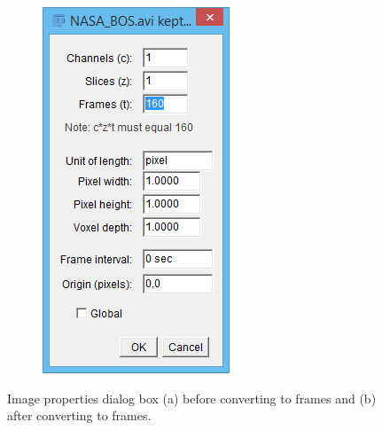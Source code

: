 \documentclass[letterpaper,12pt]{article}
\begin{document}
\begin{figure}[h]
\begin{subfigure}[b]{0.25\textwidth}
    \end{subfigure}
    \begin{subfigure}[b]{0.25\textwidth}
        \includegraphics[width=\textwidth]{Image_Properties_Final.PNG}
        \caption{}
        \label{fig:Image_Properties_Final}
    \end{subfigure}
 	
    \caption{Image properties dialog box (a) before converting to frames and (b) after converting to frames.}
    \label{fig:Image_Properties}
\end{figure}
\end{document}
